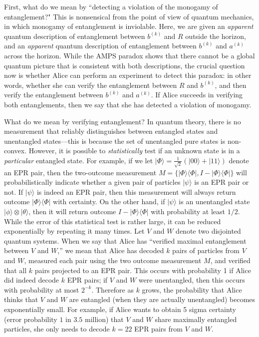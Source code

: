 \documentclass[a4paper,11pt]{article}
\theoremstyle{definition}
\newcommand{\ket}[1]{{|#1\rangle}}
\newcommand{\ketbra}[2]{|#1\rangle\! \langle #2|}
\begin{document}
First, what do we mean by ``detecting a violation of the monogamy of entanglement?"
This is nonsensical from the point of view of quantum mechanics, in which monogamy of entanglement is inviolable.
Here, we are given an \emph{apparent} quantum description of entanglement between $b^{(k)}$ and $R$ outside the horizon, and an \emph{apparent} quantum description of entanglement between $b^{(k)}$ and $a^{(k)}$ across the horizon.
While the AMPS paradox shows that there cannot be a global quantum picture that is consistent with both descriptions, the crucial question now is whether Alice can perform an experiment to detect this paradox: in other words, whether she can verify the entanglement between $R$ and $b^{(k)}$, and then verify the entanglement between $b^{(k)}$ and $a^{(k)}$.
If Alice succeeds in verifying both entanglements, then we say that she has detected a violation of monogamy.

What do we mean by verifying entanglement?
In quantum theory, there is no measurement that reliably distinguishes between entangled states and unentangled states---this is because the set of unentangled pure states is non-convex.
However, it is possible to \emph{statistically} test if an unknown state is in a \emph{particular} entangled state. For example, if we let $\ket{\Phi} = \frac{1}{\sqrt{2}} \left( \ket{00} + \ket{11} \right)$ denote an EPR pair, then the two-outcome measurement $M = \{ \ketbra{\Phi}{\Phi}, I - \ketbra{\Phi}{\Phi} \}$ will probabilistically indicate whether a given pair of particles $\ket{\psi}$ is an EPR pair or not.
If $\ket{\psi}$ is indeed an EPR pair, then this measurement will always return outcome $\ketbra{\Phi}{\Phi}$ with certainty.
On the other hand, if $\ket{\psi}$ is an unentangled state $\ket{\phi} \otimes \ket{\theta}$, then it will return outcome $I - \ketbra{\Phi}{\Phi}$ with probability at least $1/2$. While the error of this statistical test is rather large, it can be reduced exponentially by repeating it many times. 
Let $V$ and $W$ denote two disjointed quantum systems.
When we say that Alice has ``verified maximal entanglement between $V$ and $W$,'' we mean that Alice has decoded $k$ pairs of particles from $V$ and $W$, measured each pair using the two outcome measurement $M$, and verified that all $k$ pairs projected to an EPR pair.
This occurs with probability 1 if Alice did indeed decode $k$ EPR pairs; if $V$ and $W$ were unentangled, then this occurs with probability at most $2^{-k}$.
Therefore as $k$ grows, the probability that Alice thinks that $V$ and $W$ are entangled (when they are actually unentangled) becomes exponentially small.
For example, if Alice wants to obtain 5 sigma certainty (error probability $1$ in $3.5$ million) that $V$ and $W$ share maximally entangled particles, she only needs to decode $k=22$ EPR pairs from $V$ and $W$.
\end{document}
